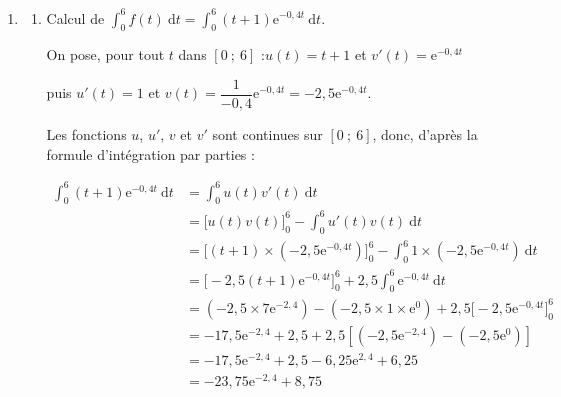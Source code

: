 \documentclass[10pt]{article}
\providecommand{\e}{{\mathrm{e}}}
\begin{document}
\begin{enumerate}
\begin{enumerate}
Sur $[1,5~;~6]$, $f$ est continue (car dérivable) et strictement décroissante et 0,7 est une valeur intermédiaire entre $f(1,5) \approx 1,37$ et $f(6) \approx 0,63$.

D'après le corollaire aux théorème des valeurs intermédiaires appliqué aux fonctions strictement monotones, l'équation $f(t) = 0,7$ admet une unique solution $\alpha$ sur $[1,5~;~6]$.

Finalement, l'équation $f(t) = 0,7$ admet bien une unique solution sur $[0~;~6]$.

\item Par approximations successives, ou en utilisant le solveur de la calculatrice, on trouve  $\alpha \approx 5,62$ heures (on donne une approximation au centième près, car la précision attendue est à la minute, qui est un soixantième d'heure).

$0,62 \times 60 \approx 37$ minutes.

La personne est en hypoglycémie au bout de 5 heures et 37 minutes après le repas.
	\end{enumerate}

\item
	\begin{enumerate}
		\item Calcul de $\displaystyle\int_0^6 f(t)\: \text{d}t = \displaystyle\int_0^6 (t + 1)\e^{-0,4t}\: \text{d}t$.

On pose, pour tout $t$ dans $[0~;~6]$ :\quad $u(t) = t + 1$ et $v'(t) = \e^{-0,4t}$

puis $u'(t) = 1$ et $v(t) = \dfrac{1}{-0,4}\e^{-0,4t} = -2,5\e^{-0,4t}$.

Les fonctions $u$, $u'$, $v$ et $v'$ sont continues sur $[0~;~6]$, donc, d'après la formule d'intégration par parties :

$\begin{aligned} \displaystyle
\int_0^6 (t + 1)\e^{-0,4t}\: \text{d}t &=\int_{0}^{6} u(t)v'(t)\: \text{d}t\\
	&= \Big[u(t)v(t)\Big]_0^6 - \int_{0}^{6}u'(t)v(t) \: \text{d}t\\
	&= \Big[(t + 1) \times \left(-2,5\e^{-0,4t}\right)\Big]_0^6 - \int_0^6 1 \times \left(-2,5\e^{-0,4t}\right)\: \text{d}t\\
	&= \Big[-2,5(t + 1)\e^{-0,4t}\Big]_0^6 + 2,5\int_0^6 \e^{-0,4t}\: \text{d}t\\
	&= \left( -2,5 \times 7\e^{-2,4}\right) - \left(- 2,5 \times 1\times \e^{0}\right) + 2,5\Big[-2,5\e^{-0,4t}\Big]_0^6\\
	&= -17,5\e^{-2,4} + 2,5 + 2,5 \left[ \left(-2,5\e^{-2,4}\right) -\left(-2,5\e^{0}\right)\right]\\
	&= -17,5\e^{-2,4} + 2,5 - 6,25 \e^{2,4} + 6,25\\
	&= -23,75\e^{-2,4} + 8,75
\end{aligned}$


\end{enumerate}
\end{enumerate}
\end{document}
